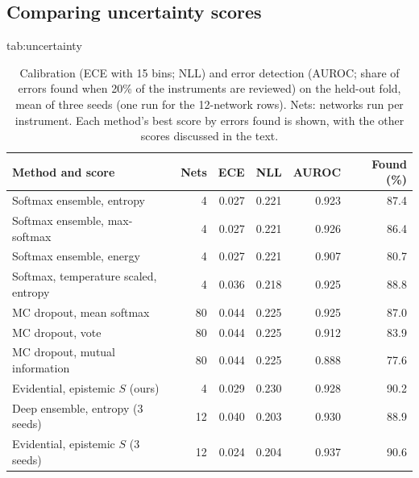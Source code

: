 \subsection{Comparing uncertainty scores}
\label{sec:uncertainty}
\begin{table}[tbp]
\floatconts
  {tab:uncertainty}
  {\caption{Calibration (ECE with 15 bins; NLL) and error detection (AUROC; share of errors found when 20\% of the instruments are reviewed) on the held-out fold, mean of three seeds (one run for the 12-network rows). Nets: networks run per instrument. Each method's best score by errors found is shown, with the other scores discussed in the text.}}
  {\footnotesize\setlength{\tabcolsep}{4pt}\begin{tabular}{lrrrrr}
  \toprule
  \bfseries Method and score & \bfseries Nets & \bfseries ECE & \bfseries NLL & \bfseries AUROC & \bfseries Found (\%)\\
  \midrule
  Softmax ensemble, entropy & 4 & 0.027 & 0.221 & 0.923 & 87.4\\
  Softmax ensemble, max-softmax & 4 & 0.027 & 0.221 & 0.926 & 86.4\\
  Softmax ensemble, energy & 4 & 0.027 & 0.221 & 0.907 & 80.7\\
  Softmax, temperature scaled, entropy & 4 & 0.036 & 0.218 & 0.925 & 88.8\\
  MC dropout, mean softmax & 80 & 0.044 & 0.225 & 0.925 & 87.0\\
  MC dropout, vote & 80 & 0.044 & 0.225 & 0.912 & 83.9\\
  MC dropout, mutual information & 80 & 0.044 & 0.225 & 0.888 & 77.6\\
  Evidential, epistemic $S$ (ours) & 4 & 0.029 & 0.230 & 0.928 & 90.2\\
  Deep ensemble, entropy (3 seeds) & 12 & 0.040 & 0.203 & 0.930 & 88.9\\
  Evidential, epistemic $S$ (3 seeds) & 12 & 0.024 & 0.204 & 0.937 & 90.6\\
  \bottomrule
  \end{tabular}}
\end{table}

